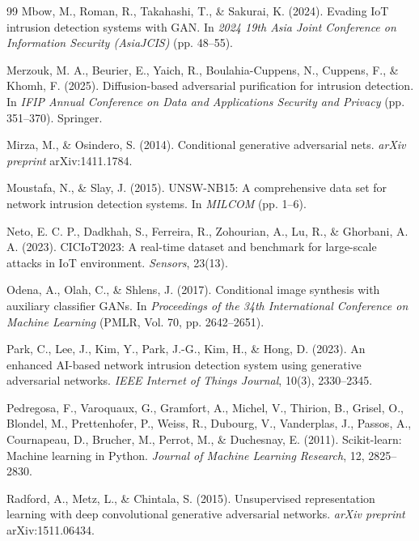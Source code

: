 \documentclass[11pt, a4paper]{article}
\begin{document}
\begin{thebibliography}{99}
Mbow, M., Roman, R., Takahashi, T., \& Sakurai, K. (2024). Evading IoT intrusion detection systems with GAN. In \textit{2024 19th Asia Joint Conference on Information Security (AsiaJCIS)} (pp. 48--55).

Merzouk, M. A., Beurier, E., Yaich, R., Boulahia-Cuppens, N., Cuppens, F., \& Khomh, F. (2025). Diffusion-based adversarial purification for intrusion detection. In \textit{IFIP Annual Conference on Data and Applications Security and Privacy} (pp. 351--370). Springer.

Mirza, M., \& Osindero, S. (2014). Conditional generative adversarial nets. \textit{arXiv preprint} arXiv:1411.1784.

Moustafa, N., \& Slay, J. (2015). UNSW-NB15: A comprehensive data set for network intrusion detection systems. In \textit{MILCOM} (pp. 1--6).

Neto, E. C. P., Dadkhah, S., Ferreira, R., Zohourian, A., Lu, R., \& Ghorbani, A. A. (2023). CICIoT2023: A real-time dataset and benchmark for large-scale attacks in IoT environment. \textit{Sensors}, 23(13).

Odena, A., Olah, C., \& Shlens, J. (2017). Conditional image synthesis with auxiliary classifier GANs. In \textit{Proceedings of the 34th International Conference on Machine Learning} (PMLR, Vol. 70, pp. 2642--2651).

Park, C., Lee, J., Kim, Y., Park, J.-G., Kim, H., \& Hong, D. (2023). An enhanced AI-based network intrusion detection system using generative adversarial networks. \textit{IEEE Internet of Things Journal}, 10(3), 2330--2345.

Pedregosa, F., Varoquaux, G., Gramfort, A., Michel, V., Thirion, B., Grisel, O., Blondel, M., Prettenhofer, P., Weiss, R., Dubourg, V., Vanderplas, J., Passos, A., Cournapeau, D., Brucher, M., Perrot, M., \& Duchesnay, E. (2011). Scikit-learn: Machine learning in Python. \textit{Journal of Machine Learning Research}, 12, 2825--2830.

Radford, A., Metz, L., \& Chintala, S. (2015). Unsupervised representation learning with deep convolutional generative adversarial networks. \textit{arXiv preprint} arXiv:1511.06434.


\end{thebibliography}
\end{document}
